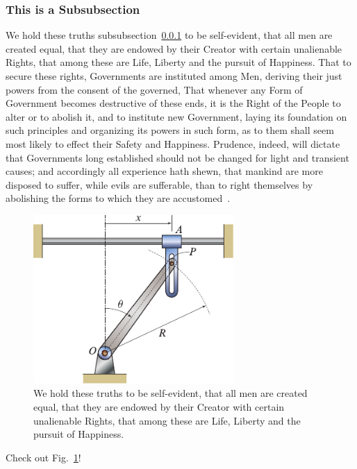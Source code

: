 \subsubsection{This is a Subsubsection}
\label{Ch1 subsection on SMAs}

We hold these truths subsubsection~\ref{Ch1 subsection on SMAs} to be self-evident, that all men are created equal,  that they are endowed by their Creator with certain unalienable Rights,  that among these are Life, Liberty and the pursuit of Happiness. That to secure these  rights, Governments are instituted among Men, deriving their just powers  from the consent of the governed, That whenever any Form of Government  becomes destructive of these ends, it is the Right of the People to alter  or to abolish it, and to institute new Government, laying its foundation on  such principles and organizing its powers in such form, as to them shall  seem most likely to effect their Safety and Happiness. Prudence, indeed, will dictate that Governments long established should not  be changed for light and transient causes; and accordingly all experience  hath shewn, that mankind are more disposed to suffer, while evils are  sufferable, than to right themselves by abolishing the forms to which they  are accustomed~\cite{SmithDavenport-1988-A-Perturbation--0,Ketema-1992-A-Physical-Inte-0,GraesserCozzarelli-1994-A-Proposed-Thre-0,RichardsonMitchell-1999-A-Simplified-Va-0,MitchellRichardson-1999-A-Simplified-Va-0,Parks-1967-A-Stability-Cri-0}.
\begin{figure}[bt]
    \centering
    \includegraphics[width=3in]{Chapter-1/Figures/mechanism}
    \caption{We hold these truths to be self-evident, that all men are created equal,  that they are endowed by their Creator with certain unalienable Rights,  that among these are Life, Liberty and the pursuit of Happiness.}
    \label{Ch1-figure: mechanism}
\end{figure}
Check out Fig.~\ref{Ch1-figure: mechanism}!


